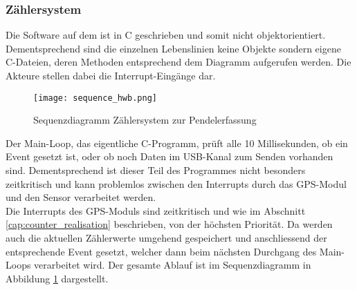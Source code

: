 	\subsubsection{Zählersystem}
	Die Software auf dem \hwb ist in C geschrieben und somit nicht objektorientiert. Dementsprechend sind die einzelnen Lebenslinien keine Objekte sondern eigene C-Dateien, deren Methoden entsprechend dem Diagramm aufgerufen werden. Die Akteure stellen dabei die Interrupt-Eingänge dar.
	\begin{figure}[H]
   		\centering
        \texttt{[image: sequence\_hwb.png]}
        \caption{Sequenzdiagramm Zählersystem zur Pendelerfassung}
        \label{fig:sequence_hwb}
    \end{figure}
	\noindent Der Main-Loop, das eigentliche C-Programm, prüft alle 10 Millisekunden, ob ein Event gesetzt ist, oder ob noch Daten im USB-Kanal zum Senden vorhanden sind. Dementsprechend ist dieser Teil des Programmes nicht besonders zeitkritisch und kann problemlos zwischen den Interrupts durch das GPS-Modul und den Sensor verarbeitet werden.\\
	Die Interrupts des GPS-Moduls sind zeitkritisch und wie im Abschnitt \ref{cap:counter_realisation} beschrieben, von der höchsten Priorität. Da werden auch die aktuellen Zählerwerte umgehend gespeichert und anschliessend der entsprechende Event gesetzt, welcher dann beim nächsten Durchgang des Main-Loops verarbeitet wird. Der gesamte Ablauf ist im Sequenzdiagramm in Abbildung \ref{fig:sequence_hwb} dargestellt.

   	